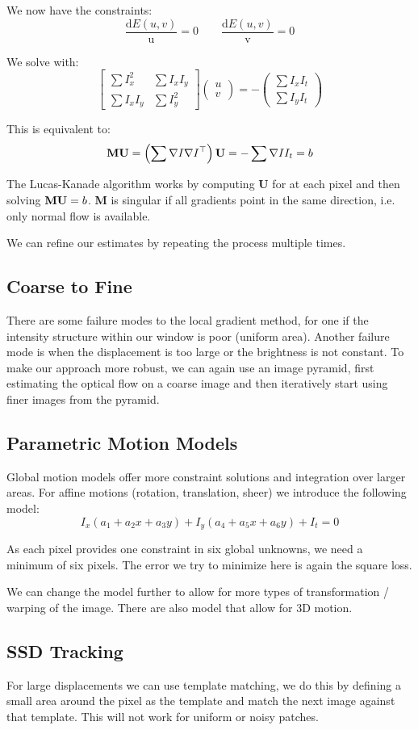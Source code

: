 We now have the constraints:
$$\frac{\mathrm d E(u, v)}{\mathrm u} = 0 \qquad \frac{\mathrm d E(u, v)}{\mathrm v} = 0$$

We solve with:
$$
\begin{bmatrix}
	\sum I_x^2 & \sum I_x I_y \\
	\sum I_x I_y & \sum I_y^2
\end{bmatrix}
\begin{pmatrix}
	u \\
	v
\end{pmatrix}
= -
\begin{pmatrix}
	\sum I_x I_t \\
	\sum I_y I_t
\end{pmatrix}
$$

This is equivalent to:
$$\textbf M \textbf U = \left( \sum \nabla I \nabla I^\top \right) \textbf U = - \sum \nabla I I_t = b$$

The Lucas-Kanade algorithm works by computing \textbf U for at each pixel and then solving $\textbf M \textbf U = b$. \textbf M is singular if all gradients point in the same direction, i.e. only normal flow is available. \medskip

We can refine our estimates by repeating the process multiple times.


\subsection{Coarse to Fine}

There are some failure modes to the local gradient method, for one if the intensity structure within our window is poor (uniform area). Another failure mode is when the displacement is too large or the brightness is not constant. To make our approach more robust, we can again use an image pyramid, first estimating the optical flow on a coarse image and then iteratively start using finer images from the pyramid.


\subsection{Parametric Motion Models}

Global motion models offer more constraint solutions and integration over larger areas. For affine motions (rotation, translation, sheer) we introduce the following model:
$$I_x (a_1 + a_2 x + a_3 y) + I_y (a_4 + a_5 x + a_6 y) + I_t = 0$$

As each pixel provides one constraint in six global unknowns, we need a minimum of six pixels. The error we try to minimize here is again the square loss. \medskip

We can change the model further to allow for more types of transformation / warping of the image. There are also model that allow for 3D motion.
 
 
\subsection{SSD Tracking}
 
For large displacements we can use template matching, we do this by defining a small area around the pixel as the template and match the next image against that template. This will not work for uniform or noisy patches.
 